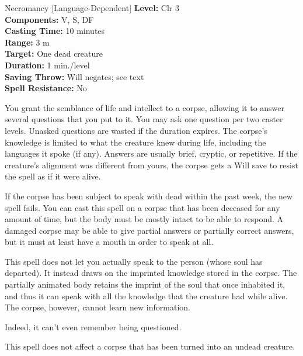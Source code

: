 {Necromancy [Language-Dependent]}
{
	\textbf{Level:}
	Clr 3\\
	\textbf{Components:}
	V, S, DF\\
	\textbf{Casting Time:}
	10 minutes\\
	\textbf{Range:}
	3 m\\
	\textbf{Target:}
	One dead creature\\
	\textbf{Duration:}
	1 min./level\\
	\textbf{Saving Throw:}
	Will negates; see text\\
	\textbf{Spell Resistance:}
	No\\
}
{
	You grant the semblance of life and intellect to a corpse, allowing it to answer several questions that you put to it. You may ask one question per two caster levels. Unasked questions are wasted if the duration expires. The corpse's knowledge is limited to what the creature knew during life, including the languages it spoke (if any). Answers are usually brief, cryptic, or repetitive. If the creature's alignment was different from yours, the corpse gets a Will save to resist the spell as if it were alive.

	If the corpse has been subject to speak with dead within the past week, the new spell fails. You can cast this spell on a corpse that has been deceased for any amount of time, but the body must be mostly intact to be able to respond. A damaged corpse may be able to give partial answers or partially correct answers, but it must at least have a mouth in order to speak at all.

	This spell does not let you actually speak to the person (whose soul has departed). It instead draws on the imprinted knowledge stored in the corpse. The partially animated body retains the imprint of the soul that once inhabited it, and thus it can speak with all the knowledge that the creature had while alive. The corpse, however, cannot learn new information.

	Indeed, it can't even remember being questioned.

	This spell does not affect a corpse that has been turned into an undead creature.

}
